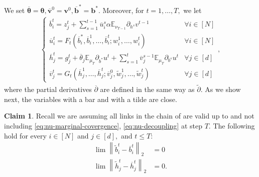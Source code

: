 \documentclass{article}
\newcommand{\1}{\mathbbm{1}}
\newcommand{\norm}[1]{\left\lVert#1\right\rVert}
\theoremstyle{plain}
\theoremstyle{definition}
\newtheorem{claim}[theorem]{Claim}
\theoremstyle{remark}
\newcommand{\E}{\mathbb{E}}
\newcommand{\bfv}{\boldsymbol{v}}
\newcommand{\bfb}{\boldsymbol{b}}
\newcommand{\bftheta}{\boldsymbol{\theta}}
\begin{document}
We set $\overline{\bftheta}=\bftheta,\overline{\bfv}^0=\bfv^0,\overline{\bfb}^* = \bfb^*.$ Moreover, for $t=1,\dots,T,$ we let
\begin{align*}
    \begin{cases}
         \overline{b}_i^t = z_j^t + \sum_{s=1}^{t-1}  \overline{u}_i^s \alpha \E_{\nu_{T-1}}  {\partial}_{ {h}^s}  {v}^{t-1} &\forall i\in [N]\\
         \overline{u}_i^t = F_t( \overline{b}_i^*,  \overline{b}_i^1,\dots, \overline{b}_i^t;w^1_i,\dots,w^t_i) &\forall i \in [N] \\
         \overline{h}_j^t = g_j^t +  \overline{\theta}_j  \E_{\mu_T}  {\partial}_{ {b}^*}  {u}^t + \sum_{s=1}^t  \overline{v}_j^{s-1} \E_{\mu_T}{\partial}_{ {b}^s}  {u}^t & \forall j\in [d] \\
         \overline{v}_j^t = G_t( \overline{h}_j^1,\dots, \overline{h}_j^t; \overline{v}_j^0, \tilde{w}^1_j,\dots, \tilde{w}^t_j) & \forall j\in [d]
    \end{cases},
\end{align*}
where the partial derivatives $\overline{\partial}$ are defined in the same way as $\tilde{\partial}.$ As we show next, the variables with a bar and with a tilde are close.
\begin{claim}\label{claim:recursive-claim-2}
    Recall we are assuming all links in the chain of  are valid up to and not including \eqref{eq:nu-marginal-covergence}, \eqref{eq:nu-decoupling} at step $T.$ The following hold for every $i\in [N]$ and $j\in [d],$  and $t\leq T$: 
    \begin{align*}
        \lim \norm{ \tilde{b}_i^t - \overline{b}_i^t } _2&= 0 \\
        \lim \norm{\tilde{h}_j^t - \overline{h}_j^t}_2 &= 0. 
    \end{align*}
\end{claim}
\end{document}
